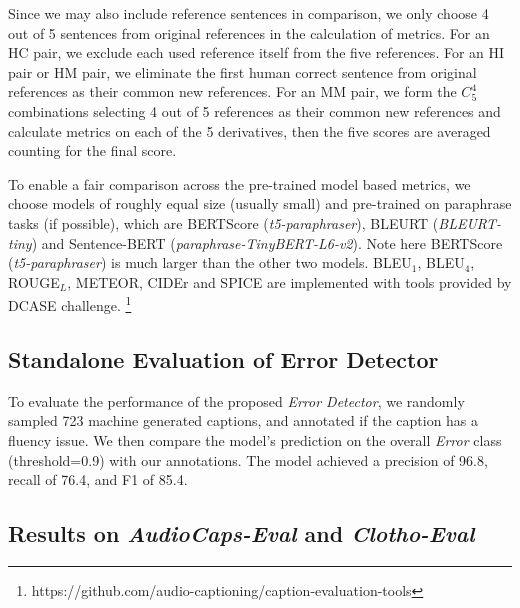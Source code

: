 \documentclass{article}
\begin{document}
Since we may also include reference sentences in comparison, we only choose 4 out of 5 sentences from original references in the calculation of metrics. For an HC pair, we exclude each used reference itself from the five references. For an HI pair or HM pair, we eliminate the first human correct sentence from original references as their common new references. For an MM pair, we form the $C_5^4$ combinations selecting 4 out of 5 references as their common new references and calculate metrics on each of the 5 derivatives, then the five scores are averaged counting for the final score. 

To enable a fair comparison across the pre-trained model based metrics, we choose models of roughly equal size (usually small) and pre-trained on paraphrase tasks (if possible), which are BERTScore (\textit{t5-paraphraser}), BLEURT (\textit{BLEURT-tiny}) and Sentence-BERT (\textit{paraphrase-TinyBERT-L6-v2}). Note here BERTScore (\textit{t5-paraphraser}) is much larger than the other two models. BLEU$_1$, BLEU$_4$, ROUGE$_L$, METEOR, CIDEr and SPICE are implemented with tools provided by DCASE challenge.
\footnote{https://github.com/audio-captioning/caption-evaluation-tools}

\subsection{Standalone Evaluation of Error Detector}

To evaluate the performance of the proposed \textit{Error Detector}, we randomly sampled 723 machine generated captions, and annotated if the caption has a fluency issue. We then compare the model's prediction on the overall \textit{Error} class (threshold=0.9) with our annotations. The model achieved a precision of 96.8, recall of 76.4, and F1 of 85.4.


\subsection{Results on \textit{AudioCaps-Eval} and \textit{Clotho-Eval}}
\label{ssec:eval_two}
\end{document}

